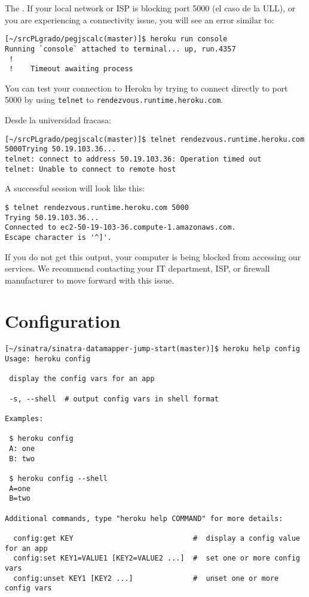 The . If
your local network or ISP is blocking port 5000 (el caso de la ULL), 
or you are experiencing
a connectivity issue, you will see an error similar to:

\begin{verbatim}
[~/srcPLgrado/pegjscalc(master)]$ heroku run console
Running `console` attached to terminal... up, run.4357
 !    
 !    Timeout awaiting process
\end{verbatim}

You can test your connection to Heroku by trying to connect directly to
port 5000 by using \verb|telnet| to \verb|rendezvous.runtime.heroku.com|. 

Desde la universidad fracasa:

\begin{verbatim}
[~/srcPLgrado/pegjscalc(master)]$ telnet rendezvous.runtime.heroku.com 5000Trying 50.19.103.36...
telnet: connect to address 50.19.103.36: Operation timed out
telnet: Unable to connect to remote host
\end{verbatim}

A successful session will look like this:

\begin{verbatim}
$ telnet rendezvous.runtime.heroku.com 5000
Trying 50.19.103.36...
Connected to ec2-50-19-103-36.compute-1.amazonaws.com.
Escape character is '^]'.
\end{verbatim}
If you do not get this output, your computer is being blocked from
accessing our services. We recommend contacting your IT department, ISP,
or firewall manufacturer to move forward with this issue.

\section{Configuration}
\begin{verbatim}
[~/sinatra/sinatra-datamapper-jump-start(master)]$ heroku help config 
Usage: heroku config

 display the config vars for an app

 -s, --shell  # output config vars in shell format

Examples:

 $ heroku config
 A: one
 B: two

 $ heroku config --shell
 A=one
 B=two

Additional commands, type "heroku help COMMAND" for more details:

  config:get KEY                            #  display a config value for an app
  config:set KEY1=VALUE1 [KEY2=VALUE2 ...]  #  set one or more config vars
  config:unset KEY1 [KEY2 ...]              #  unset one or more config vars
\end{verbatim}

